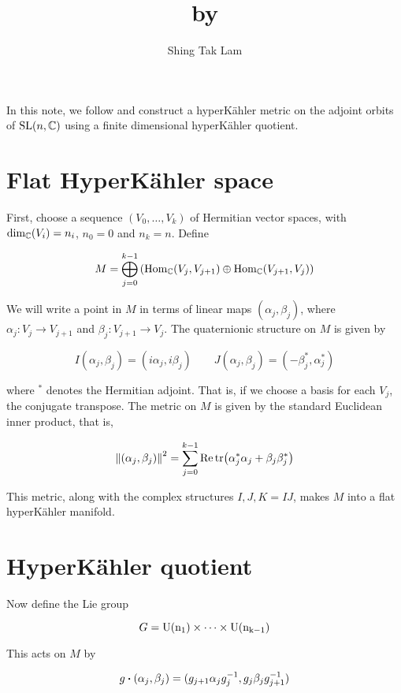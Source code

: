 \documentclass{article}
\title{\Citetitle{kobak_classical_1996} by \Citeauthor{kobak_classical_1996}}
\author{Shing Tak Lam}
\begin{document}
\maketitle

In this note, we follow \cite{kobak_classical_1996} and construct a hyperK\"ahler metric on the adjoint orbits of \(\operatorname{SL}(n, \mathbb{C})\) using a finite dimensional hyperK\"ahler quotient.

\section{Flat HyperK\"ahler space}

First, choose a sequence \((V_0, \dots, V_k)\) of Hermitian vector spaces, with \(\dim_{\mathbb{C}}(V_i) = n_i\), \(n_0 = 0\) and \(n_k = n\). Define

\[M = \bigoplus_{j=0}^{k-1}\left(\operatorname{Hom}_{\mathbb{C}}(V_j, V_{j+1}) \oplus \operatorname{Hom}_{\mathbb{C}}(V_{j+1}, V_j)\right)\]

We will write a point in \(M\) in terms of linear maps \((\alpha_j, \beta_j)\), where \(\alpha_j : V_j \to V_{j+1}\) and \(\beta_j : V_{j+1} \to V_j\). The quaternionic structure on \(M\) is given by

\[I(\alpha_j, \beta_j) = (i\alpha_j, i\beta_j) \qquad J(\alpha_j, \beta_j) = (-\beta_j^*, \alpha_j^*)\]

where \(^*\) denotes the Hermitian adjoint. That is, if we choose a basis for each \(V_j\), the conjugate transpose. The metric on \(M\) is given by the standard Euclidean inner product, that is,

\[\norm{(\alpha_j, \beta_j)}^2 = \sum_{j=0}^{k-1}\Re\tr(\alpha_j^*\alpha_j + \beta_j\beta_j^*)\]

This metric, along with the complex structures \(I, J, K = IJ\), makes \(M\) into a flat hyperK\"ahler manifold.

\section{HyperK\"ahler quotient}

\label{sec:hyperkahler-quotient}

Now define the Lie group

\[G = \rm U(n_1) \times \cdots \times \rm U(n_{k-1})\]

This acts on \(M\) by

\begin{equation}
    \label{eq:action}
    g \vdot (\alpha_j, \beta_j) = (g_{j+1}\alpha_jg_j^{-1}, g_j\beta_jg_{j+1}^{-1})
\end{equation}
\end{document}
